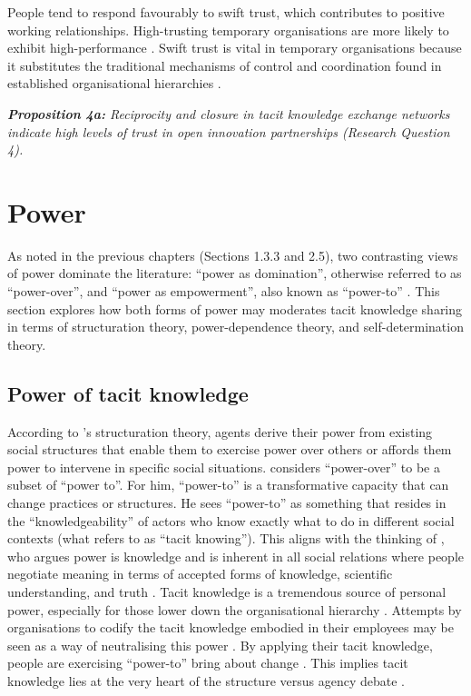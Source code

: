 People tend to respond favourably to swift trust, which contributes to positive working relationships. High-trusting temporary organisations are more likely to exhibit high-performance \citep{ashleigh2007trust}. Swift trust is vital in temporary organisations because it substitutes the traditional mechanisms of control and coordination found in established organisational hierarchies \citep{kasper2001communicating}. \bigskip

\begin{tcolorbox}
\textit{\textbf{Proposition 4a:} Reciprocity and closure in tacit knowledge exchange networks indicate high levels of trust in   open innovation partnerships (Research Question 4).}
\end{tcolorbox}

\section{Power}

As noted in the previous chapters (Sections 1.3.3 and 2.5), two contrasting views of power dominate the literature: \enquote{power as domination}, otherwise referred to as \enquote{power-over}, and \enquote{power as empowerment}, also known as \enquote{power-to} \citep{haugaard2012rethinking}. This section explores how both forms of power may moderates tacit knowledge sharing in terms of structuration theory, power-dependence theory, and self-determination theory. 

\subsection{Power of tacit knowledge}

According to \citeauthor{giddens1984constitution}'s \citeyearpar{giddens1984constitution} structuration theory, agents derive their power from existing social structures that enable them to exercise power over others or affords them power to intervene in specific social situations. \citet{giddens1984constitution} considers \enquote{power-over} to be a subset of \enquote{power to}. For him, \enquote{power-to} is a transformative capacity that can change practices or structures. He sees \enquote{power-to} as something that resides in the \enquote{knowledgeability} of actors who know exactly what to do in different social contexts (what \citet{polanyi1966logic} refers to as \enquote{tacit knowing}). This aligns with the thinking of \citet{foucault1980power}, who argues power is knowledge and is inherent in all social relations where people negotiate meaning in terms of accepted forms of knowledge, scientific understanding, and truth \citep{diamond1988foucault}. Tacit knowledge is a tremendous source of personal power, especially for those lower down the organisational hierarchy \citep{bordum2002tacit,gourlay2002tacit}. Attempts by organisations to codify the tacit knowledge embodied in their employees may be seen as a way of neutralising this power \citep{schultze2004knowing,singh2019territoriality}. By applying their tacit knowledge, people are exercising \enquote{power-to} bring about change \citep{schultze2004knowing,lam2014tacit}. This implies tacit knowledge lies at the very heart of the structure versus agency debate \citep{lam2000tacit,lam2014tacit}. 

